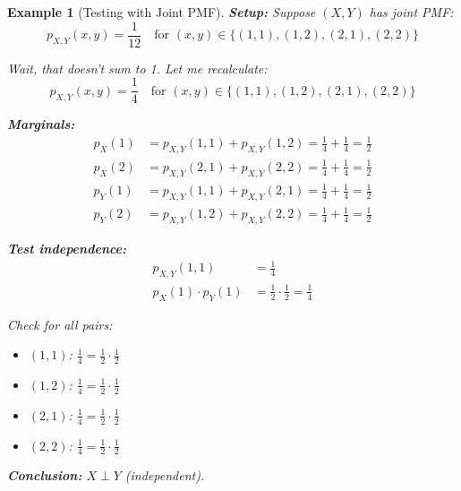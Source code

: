 \documentclass[11pt]{article}
\newtheorem{example}{Example}
\begin{document}
\begin{example}[Testing with Joint PMF]
\textbf{Setup:} Suppose $(X, Y)$ has joint PMF:
\begin{equation}
p_{X,Y}(x, y) = \frac{1}{12} \quad \text{for } (x, y) \in \{(1, 1), (1, 2), (2, 1), (2, 2)\}
\end{equation}

Wait, that doesn't sum to 1. Let me recalculate:
\begin{equation}
p_{X,Y}(x, y) = \frac{1}{4} \quad \text{for } (x, y) \in \{(1, 1), (1, 2), (2, 1), (2, 2)\}
\end{equation}

\textbf{Marginals:}
\begin{align*}
p_X(1) &= p_{X,Y}(1, 1) + p_{X,Y}(1, 2) = \frac{1}{4} + \frac{1}{4} = \frac{1}{2}\\
p_X(2) &= p_{X,Y}(2, 1) + p_{X,Y}(2, 2) = \frac{1}{4} + \frac{1}{4} = \frac{1}{2}\\
p_Y(1) &= p_{X,Y}(1, 1) + p_{X,Y}(2, 1) = \frac{1}{4} + \frac{1}{4} = \frac{1}{2}\\
p_Y(2) &= p_{X,Y}(1, 2) + p_{X,Y}(2, 2) = \frac{1}{4} + \frac{1}{4} = \frac{1}{2}
\end{align*}

\textbf{Test independence:}
\begin{align*}
p_{X,Y}(1, 1) &= \frac{1}{4}\\
p_X(1) \cdot p_Y(1) &= \frac{1}{2} \cdot \frac{1}{2} = \frac{1}{4}
\end{align*}

Check for all pairs:
\begin{itemize}
    \item $(1, 1)$: $\frac{1}{4} = \frac{1}{2} \cdot \frac{1}{2}$ \checkmark
    \item $(1, 2)$: $\frac{1}{4} = \frac{1}{2} \cdot \frac{1}{2}$ \checkmark
    \item $(2, 1)$: $\frac{1}{4} = \frac{1}{2} \cdot \frac{1}{2}$ \checkmark
    \item $(2, 2)$: $\frac{1}{4} = \frac{1}{2} \cdot \frac{1}{2}$ \checkmark
\end{itemize}

\textbf{Conclusion:} $X \perp Y$ (independent).
\end{example}
\end{document}
